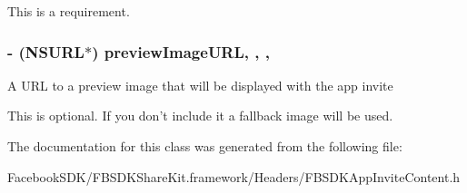 This is a requirement. \hypertarget{interface_f_b_s_d_k_app_invite_content_ac25904924b74d53be16f84df048d16b5}{
\subsubsection[{preview\-Image\-U\-R\-L}]{\setlength{\rightskip}{0pt plus 5cm}-\/ (N\-S\-U\-R\-L$\ast$) preview\-Image\-U\-R\-L\hspace{0.3cm}{\ttfamily [read]}, {\ttfamily [write]}, {\ttfamily [nonatomic]}, {\ttfamily [copy]}}}\label{interface_f_b_s_d_k_app_invite_content_ac25904924b74d53be16f84df048d16b5}
A U\-R\-L to a preview image that will be displayed with the app invite

This is optional. If you don't include it a fallback image will be used. 

The documentation for this class was generated from the following file\-:\begin{DoxyCompactItemize}
\item 
Facebook\-S\-D\-K/\-F\-B\-S\-D\-K\-Share\-Kit.\-framework/\-Headers/F\-B\-S\-D\-K\-App\-Invite\-Content.\-h\end{DoxyCompactItemize}
